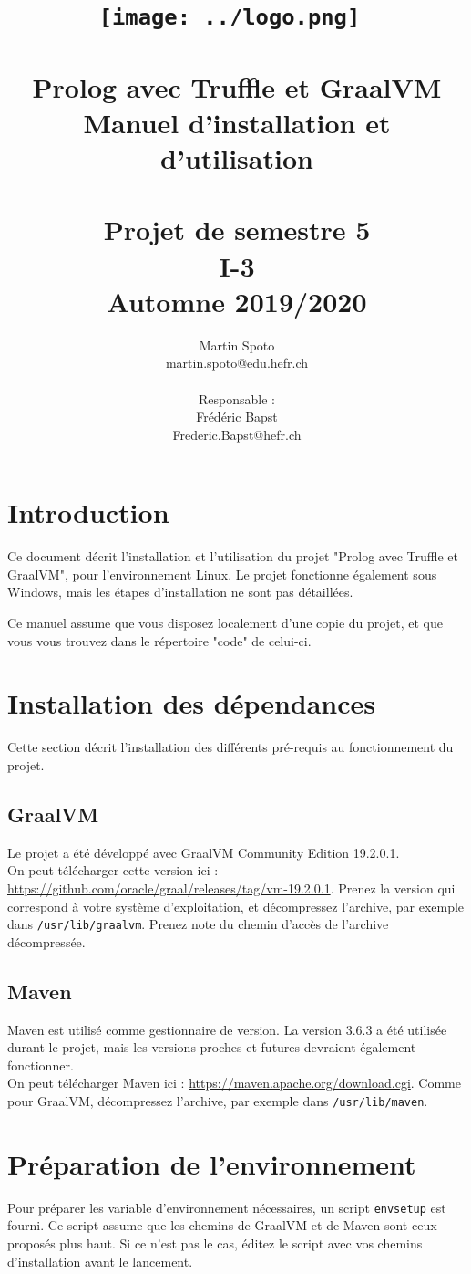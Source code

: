 \documentclass[a4paper, 12pt]{article}
\title{\vspace{-2,0cm}%
\texttt{[image: ../logo.png]}~
\\[2cm]
\Huge
\hrulefill\\
\vspace{1,0cm}
Prolog avec Truffle et GraalVM\\
Manuel d'installation et d'utilisation\\
\vspace{0,6cm}
\Large
\hrulefill\\\vspace{2,0cm}
Projet de semestre 5\\
I-3\\
Automne 2019/2020
\vspace{2.5cm}}
\author{
  Martin Spoto \\
  martin.spoto@edu.hefr.ch\\
  \\
  Responsable :\\
  Frédéric Bapst\\
  Frederic.Bapst@hefr.ch
}
\begin{document}
\maketitle

\pagebreak
\tableofcontents
\pagebreak

\section{Introduction}
Ce document décrit l'installation et l'utilisation du projet "Prolog avec Truffle et GraalVM", pour l'environnement Linux. Le projet fonctionne également sous Windows, mais les étapes d'installation ne sont pas détaillées. 

Ce manuel assume que vous disposez localement d'une copie du projet, et que vous vous trouvez dans le répertoire "code" de celui-ci.
\section{Installation des dépendances}
Cette section décrit l'installation des différents pré-requis au fonctionnement du projet.
\subsection{GraalVM}
Le projet a été développé avec GraalVM Community Edition 19.2.0.1.\\
On peut télécharger cette version ici : \href{https://github.com/oracle/graal/releases/tag/vm-19.2.0.1}{https://github.com/oracle/graal/releases/tag/vm-19.2.0.1}. Prenez la version qui correspond à votre système d'exploitation, et décompressez l'archive, par exemple dans \texttt{/usr/lib/graalvm}. Prenez note du chemin d'accès de l'archive décompressée.
\subsection{Maven}
Maven est utilisé comme gestionnaire de version. La version 3.6.3 a été utilisée durant le projet, mais les versions proches et futures devraient également fonctionner.\\
On peut télécharger Maven ici : \href{https://maven.apache.org/download.cgi}{https://maven.apache.org/download.cgi}. Comme pour GraalVM, décompressez l'archive, par exemple dans \texttt{/usr/lib/maven}.
\section{Préparation de l'environnement}
Pour préparer les variable d'environnement nécessaires, un script \texttt{envsetup} est fourni. Ce script assume que les chemins de GraalVM et de Maven sont ceux proposés plus haut. Si ce n'est pas le cas, éditez le script avec vos chemins d'installation avant le lancement.
\end{document}
